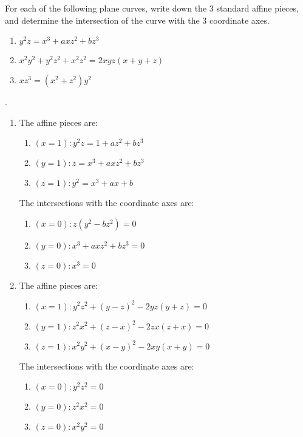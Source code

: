 \documentclass[12pt]{article}
\begin{document}
\begin{prob}
    For each of the following plane curves, write down the 3 standard affine pieces, and determine the intersection of the curve with the 3 coordinate axes.
    \begin{enumerate}[label = (\alph*)]
        \item \( y^2z = x^3 + axz^2 + bz^3 \)
        \item \( x^2y^2 + y^2z^2 + x^2z^2 = 2xyz(x+y+z) \)
        \item \( xz^3=(x^2+z^2)y^2 \)
    \end{enumerate}
\end{prob}
\sol. \begin{enumerate}[label = (\alph*)]
    \item The affine pieces are:
          \begin{enumerate}[label = (\roman*)]
              \item \( (x=1): y^2z = 1+az^2+bz^3 \)
              \item \( (y=1): z = x^3+axz^2+bz^3 \)
              \item \( (z=1): y^2=x^3+ax+b \)
          \end{enumerate}

          The intersections with the coordinate axes are:
          \begin{enumerate}[label = (\roman*)]
              \item \( (x=0): z(y^2-bz^2)=0 \)
              \item \( (y=0): x^3+axz^2+bz^3 = 0 \)
              \item \( (z=0): x^3=0 \)
          \end{enumerate}
          \smallskip

    \item The affine pieces are:
          \begin{enumerate}[label = (\roman*)]
              \item \( (x=1): y^2z^2 + (y-z)^2-2yz(y+z)=0 \)
              \item \( (y=1): z^2x^2 + (z-x)^2-2zx(z+x)=0 \)
              \item \( (z=1): x^2y^2 + (x-y)^2-2xy(x+y)=0 \)
          \end{enumerate}
          The intersections with the coordinate axes are:
          \begin{enumerate}[label = (\roman*)]
              \item \( (x=0): y^2z^2=0 \)
              \item \( (y=0): z^2x^2=0 \)
              \item \( (z=0): x^2y^2 = 0 \)
          \end{enumerate}
          \smallskip


\end{enumerate}
\end{document}
